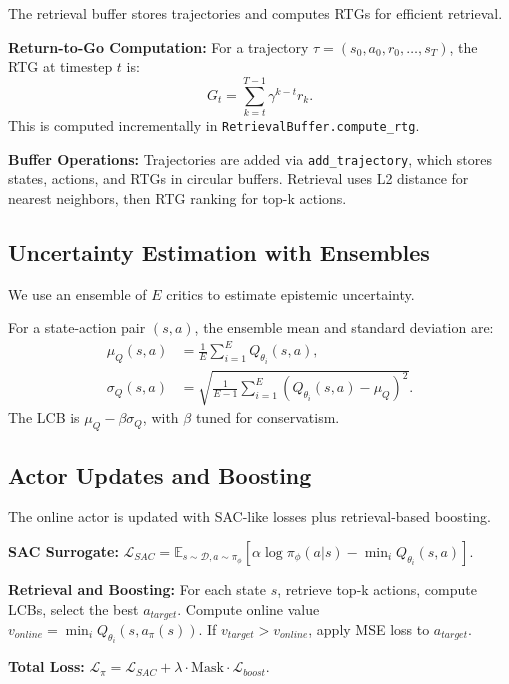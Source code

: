 \documentclass{article}
\begin{document}
The retrieval buffer stores trajectories and computes RTGs for efficient retrieval.

\textbf{Return-to-Go Computation:} For a trajectory $\tau = (s_0, a_0, r_0, \dots, s_T)$, the RTG at timestep $t$ is:
\begin{equation}
G_t = \sum_{k=t}^{T-1} \gamma^{k-t} r_k.
\end{equation}
This is computed incrementally in \texttt{RetrievalBuffer.compute_rtg}.

\textbf{Buffer Operations:} Trajectories are added via \texttt{add_trajectory}, which stores states, actions, and RTGs in circular buffers. Retrieval uses L2 distance for nearest neighbors, then RTG ranking for top-k actions.

\subsection{Uncertainty Estimation with Ensembles}

We use an ensemble of $E$ critics to estimate epistemic uncertainty.

For a state-action pair $(s,a)$, the ensemble mean and standard deviation are:
\begin{align}
\mu_Q(s,a) &= \frac{1}{E} \sum_{i=1}^E Q_{\theta_i}(s,a), \\
\sigma_Q(s,a) &= \sqrt{\frac{1}{E-1} \sum_{i=1}^E (Q_{\theta_i}(s,a) - \mu_Q)^2}.
\end{align}
The LCB is $\mu_Q - \beta \sigma_Q$, with $\beta$ tuned for conservatism.

\subsection{Actor Updates and Boosting}

The online actor is updated with SAC-like losses plus retrieval-based boosting.

\textbf{SAC Surrogate:} $\mathcal{L}_{SAC} = \mathbb{E}_{s \sim \mathcal{D}, a \sim \pi_\phi} [\alpha \log \pi_\phi(a|s) - \min_i Q_{\theta_i}(s,a)]$.

\textbf{Retrieval and Boosting:} For each state $s$, retrieve top-k actions, compute LCBs, select the best $a_{target}$. Compute online value $v_{online} = \min_i Q_{\theta_i}(s, a_\pi(s))$. If $v_{target} > v_{online}$, apply MSE loss to $a_{target}$.

\textbf{Total Loss:} $\mathcal{L}_\pi = \mathcal{L}_{SAC} + \lambda \cdot \mathrm{Mask} \cdot \mathcal{L}_{boost}$.
\end{document}
